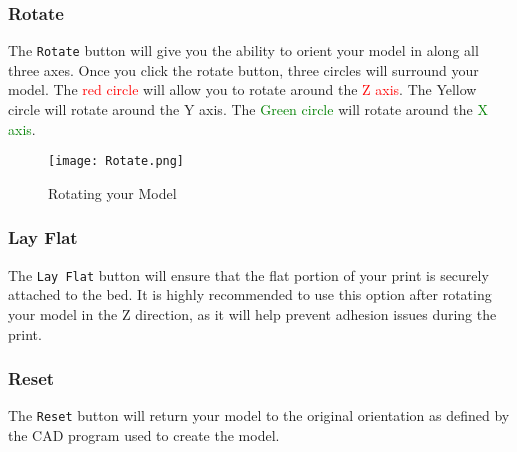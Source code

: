 \subsubsection{Rotate}
The \texttt{Rotate} button will give you the ability to orient your model in along all three axes. Once you click the rotate button, three circles will surround your model. The \textcolor{red}{red circle} will allow you to rotate around the \textcolor{red}{Z axis}. The \textcolor{yellow1}{Yellow circle} will rotate around the \textcolor{yellow1}{Y axis}. The \textcolor{green}{Green circle} will rotate around the \textcolor{green}{X axis}.
\begin{figure}[H]
\centering
\texttt{[image: Rotate.png]}
\caption{Rotating your Model}
\label{fig:Rotating your Model}
\end{figure}

\subsubsection{Lay Flat}
The \texttt{Lay Flat} button will ensure that the flat portion of your print is securely attached to the bed. It is highly recommended to use this option after rotating your model in the Z direction, as it will help prevent adhesion issues during the print.

\subsubsection{Reset}
The \texttt{Reset} button will return your model to the original orientation as defined by the CAD program used to create the model.

